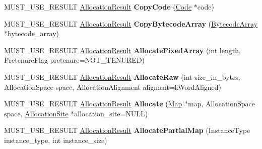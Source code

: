 \begin{DoxyCompactItemize}
\item 
M\+U\+S\+T\+\_\+\+U\+S\+E\+\_\+\+R\+E\+S\+U\+LT \hyperlink{classv8_1_1internal_1_1_allocation_result}{Allocation\+Result} {\bfseries Copy\+Code} (\hyperlink{classv8_1_1internal_1_1_code}{Code} $\ast$code)\hypertarget{classv8_1_1internal_1_1_heap_a0d255724c3a11bb01df3bc8a4c388a6b}{}\label{classv8_1_1internal_1_1_heap_a0d255724c3a11bb01df3bc8a4c388a6b}

\item 
M\+U\+S\+T\+\_\+\+U\+S\+E\+\_\+\+R\+E\+S\+U\+LT \hyperlink{classv8_1_1internal_1_1_allocation_result}{Allocation\+Result} {\bfseries Copy\+Bytecode\+Array} (\hyperlink{classv8_1_1internal_1_1_bytecode_array}{Bytecode\+Array} $\ast$bytecode\+\_\+array)\hypertarget{classv8_1_1internal_1_1_heap_ab5815d3eb904b7bff57164d3c17ca602}{}\label{classv8_1_1internal_1_1_heap_ab5815d3eb904b7bff57164d3c17ca602}

\item 
M\+U\+S\+T\+\_\+\+U\+S\+E\+\_\+\+R\+E\+S\+U\+LT \hyperlink{classv8_1_1internal_1_1_allocation_result}{Allocation\+Result} {\bfseries Allocate\+Fixed\+Array} (int length, Pretenure\+Flag pretenure=N\+O\+T\+\_\+\+T\+E\+N\+U\+R\+ED)\hypertarget{classv8_1_1internal_1_1_heap_a6e53b9d79c3f5fd759ab2d662abb7407}{}\label{classv8_1_1internal_1_1_heap_a6e53b9d79c3f5fd759ab2d662abb7407}

\item 
M\+U\+S\+T\+\_\+\+U\+S\+E\+\_\+\+R\+E\+S\+U\+LT \hyperlink{classv8_1_1internal_1_1_allocation_result}{Allocation\+Result} {\bfseries Allocate\+Raw} (int size\+\_\+in\+\_\+bytes, Allocation\+Space space, Allocation\+Alignment aligment=k\+Word\+Aligned)\hypertarget{classv8_1_1internal_1_1_heap_aab51349b34ce79361965572021f63055}{}\label{classv8_1_1internal_1_1_heap_aab51349b34ce79361965572021f63055}

\item 
M\+U\+S\+T\+\_\+\+U\+S\+E\+\_\+\+R\+E\+S\+U\+LT \hyperlink{classv8_1_1internal_1_1_allocation_result}{Allocation\+Result} {\bfseries Allocate} (\hyperlink{classv8_1_1internal_1_1_map}{Map} $\ast$map, Allocation\+Space space, \hyperlink{classv8_1_1internal_1_1_allocation_site}{Allocation\+Site} $\ast$allocation\+\_\+site=N\+U\+LL)\hypertarget{classv8_1_1internal_1_1_heap_a88f4cd15e5b30ec6c6a1d99ad1b6a18e}{}\label{classv8_1_1internal_1_1_heap_a88f4cd15e5b30ec6c6a1d99ad1b6a18e}

\item 
M\+U\+S\+T\+\_\+\+U\+S\+E\+\_\+\+R\+E\+S\+U\+LT \hyperlink{classv8_1_1internal_1_1_allocation_result}{Allocation\+Result} {\bfseries Allocate\+Partial\+Map} (Instance\+Type instance\+\_\+type, int instance\+\_\+size)\hypertarget{classv8_1_1internal_1_1_heap_a3115c53e89245ab70774acd1d022c7b3}{}\label{classv8_1_1internal_1_1_heap_a3115c53e89245ab70774acd1d022c7b3}


\end{DoxyCompactItemize}
